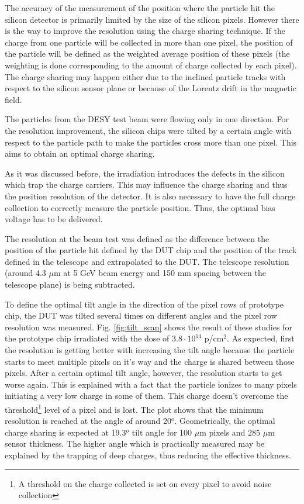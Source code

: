The accuracy of the measurement of the position where the particle hit the silicon detector is primarily limited by the size of the silicon pixels.
However there is the way to improve the resolution using the charge sharing technique. If the charge from one particle will be collected in more
than one pixel, the position of the particle will be defined as the weighted average position of these pixels (the weighting is done corresponding 
to the amount of charge collected by each pixel). The charge sharing may happen either due to the inclined particle tracks with respect to the 
silicon sensor plane or because of the Lorentz drift in the magnetic field.

The particles from the DESY test beam were flowing only in one direction. For the resolution improvement, the silicon chips were tilted by a certain 
angle with respect to the particle path to make the particles cross more than one pixel. This aims to obtain an optimal charge sharing.

As it was discussed before, the irradiation introduces the defects in the silicon which trap the charge carriers. This may influence the charge sharing
and thus the position resolution of the detector. It is also necessary to have the full charge collection to correctly measure the particle position.
Thus, the optimal bias voltage has to be delivered.

The resolution at the beam test was defined as the difference between the position of the particle hit defined by the DUT chip and the position of the
track defined in the telescope and extrapolated to the DUT. The telescope resolution (around 4.3 $\mu$m at 5 GeV beam energy and 150 mm spacing between
the telescope plane) is being subtracted.

To define the optimal tilt angle in the direction of the pixel rows of prototype chip, the DUT was tilted several times on different angles and the 
pixel row resolution was measured. Fig. \ref{fig:tilt_scan} shows the result of these studies for the prototype chip irradiated with the dose of
$3.8 \cdot 10^{14}$ p/cm$^2$. As expected, first the resolution is getting better with increasing the tilt angle because the particle starts to meet 
multiple pixels on it's way and the charge is shared between those pixels. After a certain optimal tilt angle, however, the resolution starts to get 
worse again. This is explained with a fact that the particle ionizes to many pixels initiating a very low charge in some of them. This charge doesn't
overcome the threshold\footnote{A threshold on the charge collected is set on every pixel to avoid noise collection} level of a pixel and is lost. 
The plot shows that the minimum resolution is reached at the angle of around 20$^{o}$. Geometrically, the optimal charge sharing is expected at 19.3$^{o}$
tilt angle for 100 $\mu$m pixels and 285 $\mu$m sensor thickness. The higher angle which is practically measured may be explained by the trapping
of deep charges, thus reducing the effective thickness.

